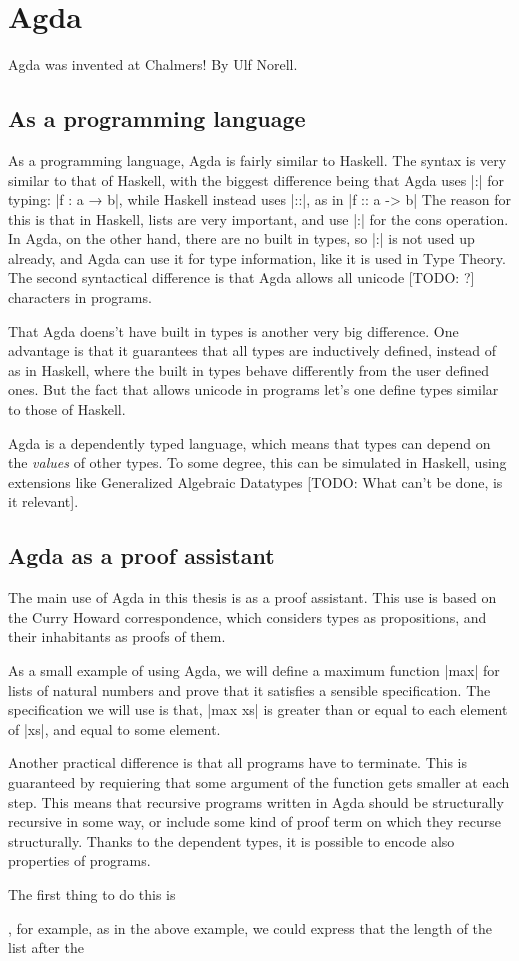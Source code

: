 \section{Agda}
Agda was invented at Chalmers! By Ulf Norell.
\subsection{As a programming language}
As a programming language, Agda is fairly similar to Haskell. The syntax is very similar to that of Haskell, with the biggest difference being that Agda uses |:| for typing: |f : a → b|, while Haskell instead uses |::|, as in |f :: a -> b|
The reason for this is that in Haskell, lists are very important, and use |:| for the cons operation. In Agda, on the other hand, there are no built in types, so |:| is not used up already, and Agda can use it for type information, like it is used in Type Theory. The second syntactical difference is that Agda allows all unicode [TODO: ?] characters in programs.

That Agda doens't have built in types is another very big difference. One advantage is that it guarantees that all types are inductively defined, instead of as in Haskell, where the built in types behave differently from the user defined ones. But the fact that allows unicode in programs let's one define types similar to those of Haskell.



Agda is a dependently typed language, which means that types can depend on the \emph{values} of other types. To some degree, this can be simulated in Haskell, using extensions like Generalized Algebraic Datatypes [TODO: What can't be done, is it relevant].

\subsection{Agda as a proof assistant}
The main use of Agda in this thesis is as a proof assistant. This use is based on the Curry Howard correspondence, which considers types as propositions, and their inhabitants as proofs of them.

As a small example of using Agda, we will define a maximum function |max| for lists of natural numbers and prove that it satisfies a sensible specification. The specification we will use is that, |max xs| is greater than or equal to each element of |xs|, and equal to some element. 


Another practical difference is that all programs have to terminate. This is guaranteed by requiering that some argument of the function gets smaller at each step. This means that recursive programs written in Agda should be structurally recursive in some way, or include some kind of proof term on which they recurse structurally.
Thanks to the dependent types, it is possible to encode also properties of programs.

The first thing to do this is 

, for example, as in the above example, we could express that the length of the list after the 
